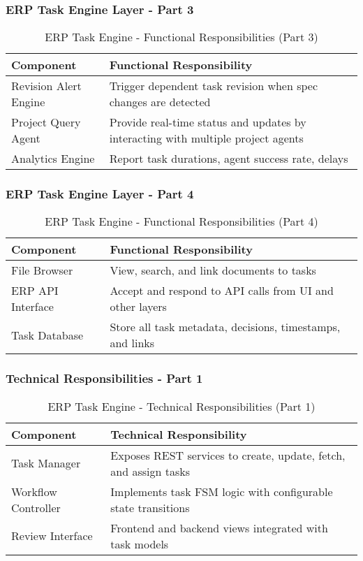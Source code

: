 \begin{frame}
    \frametitle{ERP Task Engine Layer - Part 3}
    \begin{table}[h!]
\centering
\renewcommand{\arraystretch}{1.2}
\begin{tabular}{|p{3cm}|p{7cm}|}
\hline
\textbf{Component} & \textbf{Functional Responsibility} \\
\hline
Revision Alert Engine & Trigger dependent task revision when spec changes are detected \\
\hline
Project Query Agent & Provide real-time status and updates by interacting with multiple project agents \\
\hline
Analytics Engine & Report task durations, agent success rate, delays \\
\hline
\end{tabular}
\caption{ERP Task Engine - Functional Responsibilities (Part 3)}
\end{table}
\end{frame}

\begin{frame}
    \frametitle{ERP Task Engine Layer - Part 4}
    \begin{table}[h!]
\centering
\renewcommand{\arraystretch}{1.2}
\begin{tabular}{|p{3cm}|p{7cm}|}
\hline
\textbf{Component} & \textbf{Functional Responsibility} \\
\hline
File Browser & View, search, and link documents to tasks \\
\hline
ERP API Interface & Accept and respond to API calls from UI and other layers \\
\hline
Task Database & Store all task metadata, decisions, timestamps, and links \\
\hline
\end{tabular}
\caption{ERP Task Engine - Functional Responsibilities (Part 4)}
\end{table}
\end{frame}

\begin{frame}
    \frametitle{Technical Responsibilities - Part 1}
    \begin{table}[h!]
\centering
\renewcommand{\arraystretch}{1.2}
\begin{tabular}{|p{3cm}|p{7cm}|}
\hline
\textbf{Component} & \textbf{Technical Responsibility} \\
\hline
Task Manager & Exposes REST services to create, update, fetch, and assign tasks \\
\hline
Workflow Controller & Implements task FSM logic with configurable state transitions \\
\hline
Review Interface & Frontend and backend views integrated with task models \\
\hline
\end{tabular}
\caption{ERP Task Engine - Technical Responsibilities (Part 1)}
\end{table}
\end{frame}

